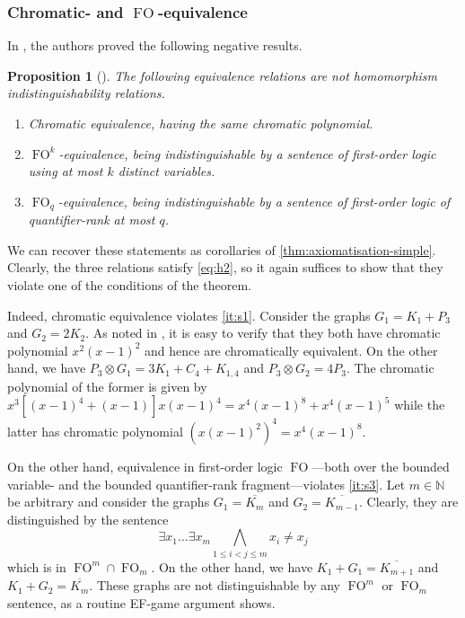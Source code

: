\documentclass[11pt]{scrartcl}
\theoremstyle{definition}
\theoremstyle{plain}
\newtheorem{proposition}[definition]{Proposition}
\theoremstyle{remark}
\begin{document}
    

    \subsubsection{Chromatic- and \texorpdfstring{$\operatorname{FO}$-equivalence}{FO-equivalence}}
    \label{subsec:FO-equiv}

    In \cite{atserias_expressive_2021}, the authors proved the following negative results.

    \begin{proposition}[{\cite[Theorem 17, Proposition 1, Proposition 2]{atserias_expressive_2021}}]
        The following equivalence relations are not homomorphism indistinguishability relations. 
        \begin{enumerate}
            \item Chromatic equivalence, having the same chromatic polynomial.
            \item $\operatorname{FO}^k$-equivalence, being indistinguishable by a sentence of first-order logic using at most $k$ distinct variables.
            \item $\operatorname{FO}_q$-equivalence, being indistinguishable by a sentence of first-order logic of quantifier-rank at most $q$.
        \end{enumerate}
    \end{proposition}

    We can recover these statements as corollaries of \cref{thm:axiomatisation-simple}. Clearly, the three relations satisfy \cref{eq:h2}, so it again suffices to show that they violate one of the conditions of the theorem.

    Indeed, chromatic equivalence violates \cref{it:s1}. Consider the graphs $G_1 = K_1 + P_3$ and $G_2 = 2 K_2$. As noted in \cite{atserias_expressive_2021}, it is easy to verify that they both have chromatic polynomial $x^2 (x-1)^2$ and hence are chromatically equivalent. On the other hand, we have $P_3 \otimes G_1 = 3 K_1 + C_4 + K_{1, 4}$ and $P_3 \otimes G_2 = 4 P_3$. The chromatic polynomial of the former is given by $x^3[(x-1)^4 + (x-1)]x(x-1)^4 = x^4(x-1)^8 + x^4(x-1)^5$ while the latter has chromatic polynomial $(x(x-1)^2)^4 = x^4(x-1)^8$.

    On the other hand, equivalence in first-order logic $\operatorname{FO}$---both over the bounded variable- and the bounded quantifier-rank fragment---violates \cref{it:s3}. Let $m \in \mathbb{N}$ be arbitrary and consider the graphs $G_1 = \overline{K_m}$ and $G_2 = \overline{K_{m-1}}$. Clearly, they are distinguished by the sentence
    \begin{equation*}
        \exists x_1 \dots \exists x_m \bigwedge_{1 \leq i < j \leq m} x_i \neq x_j
    \end{equation*}
    which is in $\operatorname{FO}^m \cap \operatorname{FO}_m$.
    On the other hand, we have $K_1 + G_1 = \overline{K_{m+1}}$ and $K_1 + G_2 = \overline{K_m}$. These graphs are not distinguishable by any $\operatorname{FO}^m$ or $\operatorname{FO}_m$ sentence, as a routine EF-game argument shows.
    
\end{document}
